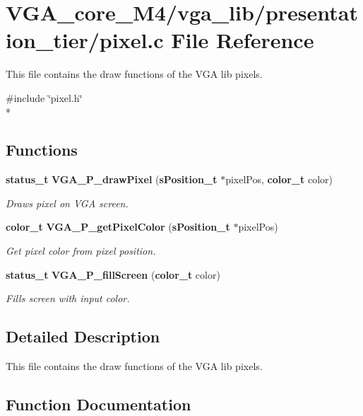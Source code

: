 \section{V\+G\+A\+\_\+core\+\_\+\+M4/vga\+\_\+lib/presentation\+\_\+tier/pixel.c File Reference}
\label{pixel_8c}


This file contains the draw functions of the V\+GA lib pixels.  


{\ttfamily \#include \char`\"{}pixel.\+h\char`\"{}}\\*
\subsection*{Functions}
\begin{DoxyCompactItemize}
\item 
{\bf status\+\_\+t} {\bf V\+G\+A\+\_\+\+P\+\_\+draw\+Pixel} ({\bf s\+Position\+\_\+t} $\ast$pixel\+Pos, {\bf color\+\_\+t} color)
\begin{DoxyCompactList}\small\item\em Draws pixel on V\+GA screen. \end{DoxyCompactList}\item 
{\bf color\+\_\+t} {\bf V\+G\+A\+\_\+\+P\+\_\+get\+Pixel\+Color} ({\bf s\+Position\+\_\+t} $\ast$pixel\+Pos)
\begin{DoxyCompactList}\small\item\em Get pixel color from pixel position. \end{DoxyCompactList}\item 
{\bf status\+\_\+t} {\bf V\+G\+A\+\_\+\+P\+\_\+fill\+Screen} ({\bf color\+\_\+t} color)
\begin{DoxyCompactList}\small\item\em Fills screen with input color. \end{DoxyCompactList}\end{DoxyCompactItemize}


\subsection{Detailed Description}
This file contains the draw functions of the V\+GA lib pixels. 



\subsection{Function Documentation}
